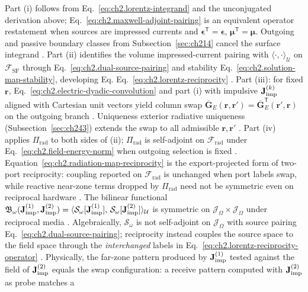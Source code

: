 Part (i) follows from Eq.~\eqref{eq:ch2.lorentz-integrand} and the unconjugated derivation above;
Eq.~\eqref{eq:ch2.maxwell-adjoint-pairing} is an equivalent operator restatement when sources are impressed currents and
$\boldsymbol{\epsilon}^{\mathsf{T}}=\boldsymbol{\epsilon}$, $\boldsymbol{\mu}^{\mathsf{T}}=\boldsymbol{\mu}$. Outgoing and passive
boundary classes from Subsection~\ref{sec:ch214} cancel the surface integrand
\cite{stratton1941}. Part (ii) identifies the volume impressed-current pairing
with \(\langle\cdot,\cdot\rangle_{\mathcal{U}}\) on \(\mathcal{F}_{\mathrm{SF}}\) through
Eq.~\eqref{eq:ch2.dual-source-pairing} and stability
Eq.~\eqref{eq:ch2.solution-map-stability}, developing Eq.
Eq.~\eqref{eq:ch2.lorentz-reciprocity} \cite{stratton1941}. Part (iii): for fixed
\(\mathbf{r}\), Eq.~\eqref{eq:ch2.electric-dyadic-convolution} and part (i) with impulsive
\(\mathbf{J}_{\mathrm{imp}}^{(k)}\) aligned with Cartesian unit vectors yield column swap
\(\overline{\mathbf{G}}_{E}(\mathbf{r},\mathbf{r}')=
\overline{\mathbf{G}}_{E}^{\mathsf{T}}(\mathbf{r}',\mathbf{r})\) on the outgoing branch
\cite{stratton1941}. Uniqueness exterior radiative uniqueness (Subsection~\ref{sec:ch243})
extends the swap to all admissible \(\mathbf{r},\mathbf{r}'\) \cite{stratton1941}. Part (iv)
applies \(\Pi_{\mathrm{rad}}\) to both sides of (ii); \(\Pi_{\mathrm{rad}}\) is self-adjoint
on \(\mathcal{F}_{\mathrm{rad}}\) under Eq.~\eqref{eq:ch2.field-energy-norm} when outgoing
selection is fixed \cite{stratton1941}. Equation~\eqref{eq:ch2.radiation-map-reciprocity} is the export-projected
form of two-port reciprocity: coupling reported on \(\mathcal{F}_{\mathrm{rad}}\) is unchanged when
port labels swap, while reactive near-zone terms dropped by \(\Pi_{\mathrm{rad}}\) need not be
symmetric even on reciprocal hardware \cite{stratton1941}.
The bilinear functional
\(\mathfrak{B}_\omega(\mathbf{J}_{\mathrm{imp}}^{(1)},\mathbf{J}_{\mathrm{imp}}^{(2)})=
\langle \mathcal{S}_\omega[\mathbf{J}_{\mathrm{imp}}^{(1)}],\,\mathcal{S}_\omega[\mathbf{J}_{\mathrm{imp}}^{(2)}]\rangle_{\mathcal{U}}\)
is symmetric on \(\mathcal{J}_\Omega\times\mathcal{J}_\Omega\) under reciprocal media
\cite{stratton1941}. Algebraically, \(\mathcal{S}_\omega\) is not self-adjoint
on \(\mathcal{J}_\Omega\) with source pairing Eq.~\eqref{eq:ch2.dual-source-pairing}; reciprocity
instead couples the source space to the field space through the \emph{interchanged} labels in
Eq.~\eqref{eq:ch2.lorentz-reciprocity-operator} \cite{stratton1941}. Physically, the far-zone
pattern produced by \(\mathbf{J}_{\mathrm{imp}}^{(1)}\) tested against the field of \(\mathbf{J}_{\mathrm{imp}}^{(2)}\) equals the
swap configuration: a receive pattern computed with \(\mathbf{J}_{\mathrm{imp}}^{(2)}\) as probe matches a
